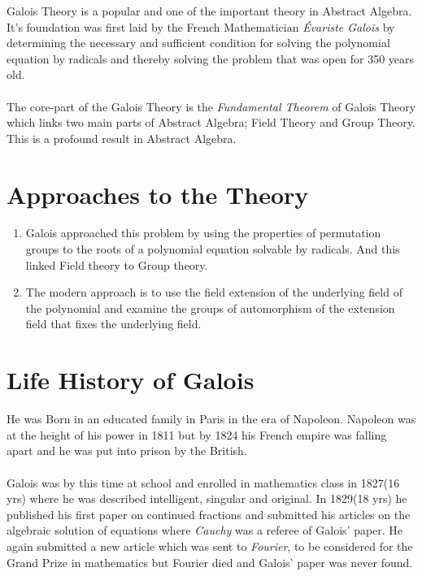 Galois Theory is a popular and one of the important theory in Abstract Algebra. It's foundation was first laid by the French Mathematician \textit{Évariste Galois} by determining the necessary and sufficient condition for solving the polynomial equation by radicals and thereby solving the problem that was open for 350 years old.\\ \\
The core-part of the Galois Theory is the \textit{Fundamental Theorem} of Galois Theory which links two main parts of Abstract Algebra; Field Theory and Group Theory. This is a profound result in Abstract Algebra. \\

\section{Approaches to the Theory}
\begin{enumerate}
\item Galois approached this problem by using the properties of permutation groups to the roots of a
polynomial equation solvable by radicals. And this linked Field theory to Group theory.
\item The modern approach is to use the field extension of the underlying field of the polynomial and
examine the groups of automorphism of the extension field that fixes the underlying field.
\end{enumerate}

\clearpage

\section{Life History of Galois}

He was Born in an educated family in Paris in the era of Napoleon. Napoleon was at the height of his power in 1811 but by 1824 his French empire was falling apart and he was put into prison by the British.\\ \\
Galois was by this time at school and enrolled in mathematics class in 1827(16 yrs) where he was described intelligent, singular and original. In 1829(18 yrs) he published his first paper on continued fractions and submitted his articles on the algebraic solution of equations where
\textit{Cauchy} was a referee of Galois’ paper. He again submitted a new article which was sent to \textit{Fourier}, to be considered for the Grand Prize in mathematics but Fourier died and Galois’ paper was never found.\\ \\

